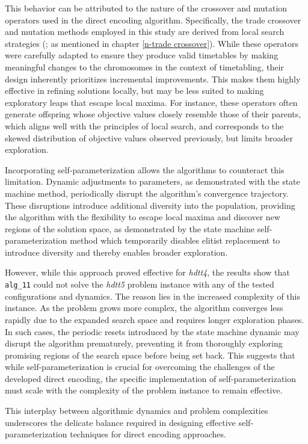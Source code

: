 \documentclass[english,examples]{isasthesis}
\begin{document}
This behavior can be attributed to the nature of the crossover and mutation
operators used in the direct encoding algorithm.
Specifically, the trade crossover and mutation methods employed in this study
are derived from local search strategies (\cite{demiroBitvec,Fonseca2014}; as
mentioned in chapter \ref{n-trade crossover}).
While these operators were carefully adapted to ensure they produce valid
timetables by making meaningful changes to the chromosomes in the context of
timetabling, their design inherently prioritizes incremental improvements.
This makes them highly effective in refining solutions locally, but may be less
suited to making exploratory leaps that escape local maxima. For instance,
these operators often generate offspring whose objective values closely
resemble those of their parents, which aligns well with the principles of
local search, and corresponds to the skewed distribution of objective values
observed previously, but limits broader exploration.

Incorporating self-parameterization allows the algorithms to counteract this
limitation. Dynamic adjustments to parameters, as demonstrated with the
state machine method, periodically disrupt the algorithm's convergence
trajectory. These disruptions introduce additional diversity into the
population, providing the algorithm with the flexibility to escape local maxima
and discover new regions of the solution space, as demonstrated by the
state machine self-parameterization method which temporarily disables
elitist replacement to introduce diversity and thereby enables broader
exploration.

However, while this approach proved effective for \textit{hdtt4}, the results
show that \texttt{alg\_11} could not solve the \textit{hdtt5} problem instance
with any of the tested configurations and dynamics. The reason lies in the
increased complexity of this instance. As the problem grows more complex, the
algorithm converges less rapidly due to the expanded search space and requires
longer exploration phases. In such cases, the periodic resets introduced by
the state machine dynamic may disrupt the algorithm prematurely, preventing
it from thoroughly exploring promising regions of the search space before
being set back. This suggests that while self-parameterization is crucial for
overcoming the challenges of the developed direct encoding, the specific
implementation of self-parameterization must scale with the complexity of the
problem instance to remain effective.

This interplay between algorithmic dynamics and problem complexities underscores
the delicate balance required in designing effective self-parameterization
techniques for direct encoding approaches.
\end{document}

